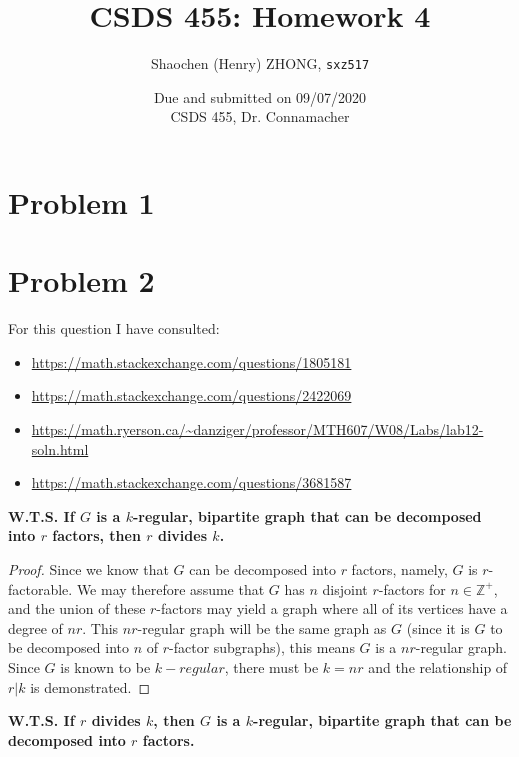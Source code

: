 \documentclass[11pt]{article}
\newcommand{\ilc}{\texttt}
\begin{document}
\title{\textbf{CSDS 455: Homework 4}}

\author{Shaochen (Henry) ZHONG, \ilc{sxz517}}
\date{Due and submitted on 09/07/2020 \\ CSDS 455, Dr. Connamacher}
\maketitle

\section{Problem 1}


\section{Problem 2}

For this question I have consulted:
\begin{itemize}
    \item \url{https://math.stackexchange.com/questions/1805181}
    \item \url{https://math.stackexchange.com/questions/2422069}
    \item \url{https://math.ryerson.ca/~danziger/professor/MTH607/W08/Labs/lab12-soln.html}
    \item \url{https://math.stackexchange.com/questions/3681587}
\end{itemize}

\noindent\textbf{W.T.S. If $G$ is a $k$-regular, bipartite graph that can be decomposed into $r$ factors, then $r$ divides $k$.}
\begin{proof}
Since we know that $G$ can be decomposed into $r$ factors, namely, $G$ is $r$-factorable. We may therefore assume that $G$ has $n$ disjoint $r$-factors for $n \in \mathbb{Z}^+$, and the union of these $r$-factors may yield a graph where all of its vertices have a degree of $nr$. This $nr$-regular graph will be the same graph as $G$ (since it is $G$ to be decomposed into $n$ of $r$-factor subgraphs), this means $G$ is a $nr$-regular graph. Since $G$ is known to be $k-regular$, there must be $k = nr$ and the relationship of $r | k$ is demonstrated.
\end{proof}


\noindent\textbf{W.T.S. If $r$ divides $k$, then $G$ is a $k$-regular, bipartite graph that can be decomposed into $r$ factors.}
\end{document}
